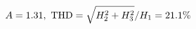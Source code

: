 \documentclass[preview]{standalone}
\begin{document}
\begin{align*}
\special{dvisvgm:raw <g id='unique000'>}A=1.31,\ \text{THD}=\sqrt{H_2^2+H_3^2}/H_1=21.1\%\special{dvisvgm:raw </g>}
\end{align*}
\end{document}
